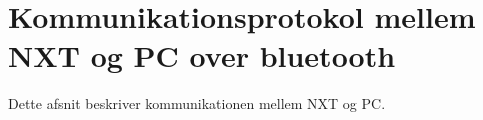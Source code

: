 \section{Kommunikationsprotokol mellem NXT og PC over bluetooth}
Dette afsnit beskriver kommunikationen mellem NXT og PC.
